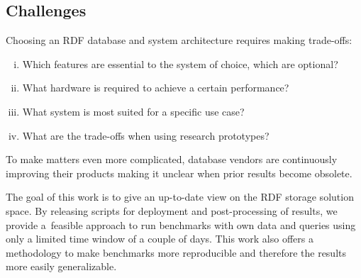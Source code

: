 \subsection{Challenges}

Choosing an RDF database and system architecture requires making trade-offs: 

\begin{enumerate}[(i)]
	\item Which features are essential to the system of choice, which are optional?
	\item What hardware is required to achieve a certain performance?
	\item What system is most suited for a specific use case?
	\item What are the trade-offs when using research prototypes? 
\end{enumerate}

To make matters even more complicated, database vendors are continuously improving their products making it unclear when prior results become obsolete.

The goal of this work is to give an up-to-date view on the RDF storage solution space.
By releasing scripts for deployment and post-processing of results, we provide a~feasible approach to run benchmarks with own data and queries using only a limited time window of a couple of days.
This work also offers a methodology to make benchmarks more reproducible and therefore the results more easily generalizable.

